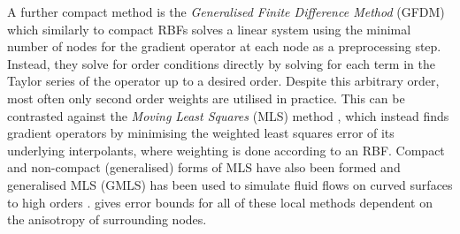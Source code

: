 A further compact method is the \emph{Generalised Finite Difference Method} (GFDM) \cite{jensen1972FiniteDifferenceTechniques} which similarly to compact RBFs solves a linear system using the minimal number of nodes for the gradient operator at each node as a preprocessing step. Instead, they solve for order conditions directly by solving for each term in the Taylor series of the operator up to a desired order. Despite this arbitrary order, most often only second order weights are utilised in practice. This can be contrasted against the \emph{Moving Least Squares} (MLS) method \cite{lancaster1981SurfacesGeneratedMoving}, which instead finds gradient operators by minimising the weighted least squares error of its underlying interpolants, where weighting is done according to an RBF. Compact and non-compact (generalised) forms of MLS have also been formed \cite{trask2016CompactMovingLeast, trask2017HighOrderStaggeredMeshless} and generalised MLS (GMLS) has been used to simulate fluid flows on curved surfaces to high orders \cite{gross2020MeshfreeMethodsManifolds}. \cite{davydov2016ErrorBoundsKernelbased} gives error bounds for all of these local methods dependent on the anisotropy of surrounding nodes.

